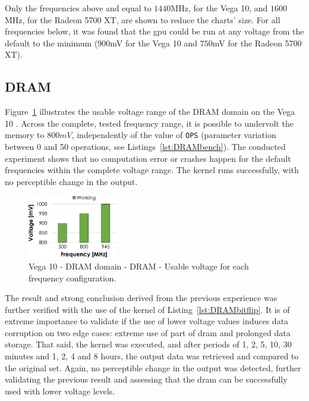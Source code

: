 Only the frequencies above and equal to $1440$MHz, for the Vega 10, and $1600$MHz, for the Radeon 5700 XT, are shown to reduce the charts' size. For all frequencies below, it was found that the \acrshort{gpu} could be run at any voltage from the default to the minimum ($900$mV for the Vega 10 and $750$mV for the Radeon 5700 XT).


\subsection{DRAM}

Figure~\ref{fig:DRAM_guardband} illustrates the usable voltage range of the DRAM domain on the Vega 10 . Across the complete, tested frequency range, it is possible to undervolt the memory to $800mV$, independently of the value of \texttt{OPS} (parameter variation between 0 and 50 operations, see Listings~\ref{lst:DRAMbench}).
The conducted experiment shows that no computation error or crashes happen for the default frequencies within the complete voltage range. The kernel runs successfully, with no perceptible change in the output.


\begin{figure}[htb]
  \centering
  \includegraphics[width=0.35\textwidth]{Figures/GPU_characterization/DRAM_Guardband.pdf}
  \caption{Vega 10 - DRAM domain - DRAM - Usable voltage for each frequency configuration.}
  \label{fig:DRAM_guardband}
\end{figure}

The result and strong conclusion derived from the previous experience was further verified with the use of the kernel of Listing~\ref{lst:DRAMbitflip}. It is of extreme importance to validate if the use of lower voltage values induces data corruption on two edge cases: extreme use of part of \acrshort{dram} and prolonged data storage. That said, the kernel was executed, and after periods of 1, 2, 5, 10, 30 minutes and 1, 2, 4 and 8 hours, the output data was retrieved and compared to the original set. Again, no perceptible change in the output was detected, further validating the previous result and assessing that the \acrshort{dram} can be successfully used with lower voltage levels. 

